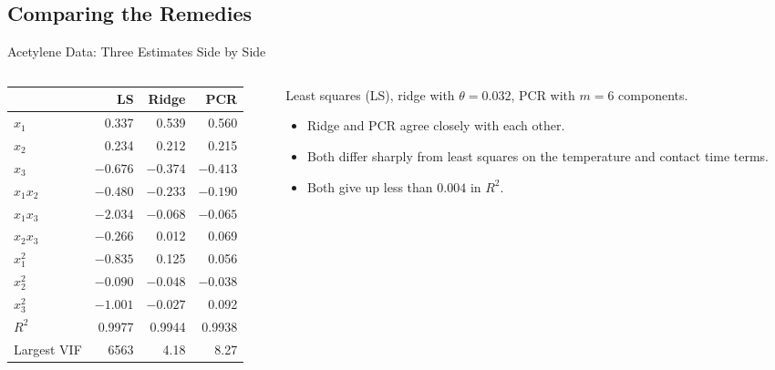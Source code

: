 \subsection{Comparing the Remedies}


\begin{frame}{Acetylene Data: Three Estimates Side by Side}
    \begin{columns}[T]
    \begin{column}{0.62\textwidth}
    \centering
        \footnotesize
        \begin{tabular}{lrrr}
            \toprule
            & LS & Ridge & PCR \\
            \midrule
            $x_1$ & 0.337 & 0.539 & 0.560 \\
            $x_2$ & 0.234 & 0.212 & 0.215 \\
            $x_3$ & $-0.676$ & $-0.374$ & $-0.413$ \\
            $x_1x_2$ & $-0.480$ & $-0.233$ & $-0.190$ \\
            $x_1x_3$ & $-2.034$ & $-0.068$ & $-0.065$ \\
            $x_2x_3$ & $-0.266$ & 0.012 & 0.069 \\
            $x_1^2$ & $-0.835$ & 0.125 & 0.056 \\
            $x_2^2$ & $-0.090$ & $-0.048$ & $-0.038$ \\
            $x_3^2$ & $-1.001$ & $-0.027$ & 0.092 \\
            \midrule
            $R^2$ & 0.9977 & 0.9944 & 0.9938 \\
            Largest VIF & 6563 & 4.18 & 8.27 \\
            \bottomrule
        \end{tabular}
    \end{column}
    \begin{column}{0.38\textwidth}
        \small
        Least squares (LS), ridge with $\theta=0.032$, PCR with $m=6$ components.
        \begin{itemize}
            \item Ridge and PCR agree closely with each other.
            \item Both differ sharply from least squares on the temperature and contact time terms.
            \item Both give up less than $0.004$ in $R^2$.
        \end{itemize}
    \end{column}
    \end{columns}
\end{frame}



